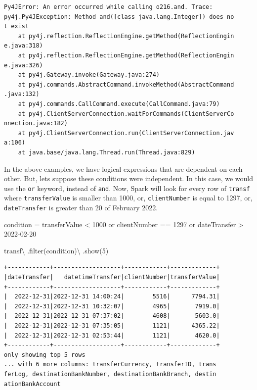 \documentclass[
  11pt,
  letterpaper,
  DIV=11,
  numbers=noendperiod]{scrreprt}
\newenvironment{Shaded}{\begin{snugshade}}{\end{snugshade}}
\newcommand{\BuiltInTok}[1]{\textcolor[rgb]{0.00,0.23,0.31}{#1}}
\newcommand{\DecValTok}[1]{\textcolor[rgb]{0.68,0.00,0.00}{#1}}
\newcommand{\NormalTok}[1]{\textcolor[rgb]{0.00,0.23,0.31}{#1}}
\newcommand{\OperatorTok}[1]{\textcolor[rgb]{0.37,0.37,0.37}{#1}}
\newcommand{\StringTok}[1]{\textcolor[rgb]{0.13,0.47,0.30}{#1}}
\begin{document}
\begin{verbatim}
Py4JError: An error occurred while calling o216.and. Trace:
py4j.Py4JException: Method and([class java.lang.Integer]) does no
t exist
    at py4j.reflection.ReflectionEngine.getMethod(ReflectionEngin
e.java:318)
    at py4j.reflection.ReflectionEngine.getMethod(ReflectionEngin
e.java:326)
    at py4j.Gateway.invoke(Gateway.java:274)
    at py4j.commands.AbstractCommand.invokeMethod(AbstractCommand
.java:132)
    at py4j.commands.CallCommand.execute(CallCommand.java:79)
    at py4j.ClientServerConnection.waitForCommands(ClientServerCo
nnection.java:182)
    at py4j.ClientServerConnection.run(ClientServerConnection.jav
a:106)
    at java.base/java.lang.Thread.run(Thread.java:829)
\end{verbatim}

In the above examples, we have logical expressions that are dependent on
each other. But, lets suppose these conditions were independent. In this
case, we would use the \texttt{or} keyword, instead of \texttt{and}.
Now, Spark will look for every row of \texttt{transf} where
\texttt{transferValue} is smaller than 1000, or, \texttt{clientNumber}
is equal to 1297, or, \texttt{dateTransfer} is greater than 20 of
February 2022.

\begin{Shaded}
\begin{Highlighting}[]
\NormalTok{condition }\OperatorTok{=} \StringTok{\textquotesingle{}\textquotesingle{}\textquotesingle{}}
\StringTok{  transferValue \textless{} 1000}
\StringTok{  or clientNumber == 1297 }
\StringTok{  or dateTransfer \textgreater{} \textquotesingle{}2022{-}02{-}20\textquotesingle{}}
\StringTok{\textquotesingle{}\textquotesingle{}\textquotesingle{}}

\NormalTok{transf}\OperatorTok{\textbackslash{}}
\NormalTok{  .}\BuiltInTok{filter}\NormalTok{(condition)}\OperatorTok{\textbackslash{}}
\NormalTok{  .show(}\DecValTok{5}\NormalTok{)}
\end{Highlighting}
\end{Shaded}

\begin{verbatim}
+------------+-------------------+------------+-------------+
|dateTransfer|   datetimeTransfer|clientNumber|transferValue|
+------------+-------------------+------------+-------------+
|  2022-12-31|2022-12-31 14:00:24|        5516|      7794.31|
|  2022-12-31|2022-12-31 10:32:07|        4965|       7919.0|
|  2022-12-31|2022-12-31 07:37:02|        4608|       5603.0|
|  2022-12-31|2022-12-31 07:35:05|        1121|      4365.22|
|  2022-12-31|2022-12-31 02:53:44|        1121|       4620.0|
+------------+-------------------+------------+-------------+
only showing top 5 rows
... with 6 more columns: transferCurrency, transferID, trans
ferLog, destinationBankNumber, destinationBankBranch, destin
ationBankAccount
\end{verbatim}
\end{document}
